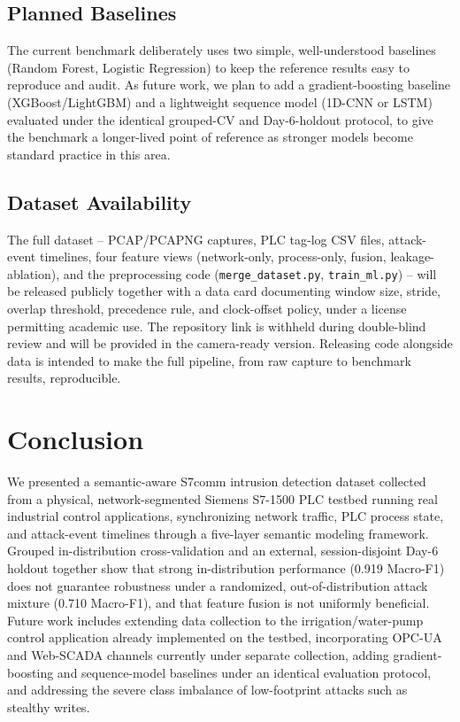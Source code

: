 \documentclass[conference]{IEEEtran}
\begin{document}
\subsection{Planned Baselines}
The current benchmark deliberately uses two simple, well-understood baselines (Random Forest, Logistic Regression) to keep the reference results easy to reproduce and audit. As future work, we plan to add a gradient-boosting baseline (XGBoost/LightGBM) and a lightweight sequence model (1D-CNN or LSTM) evaluated under the identical grouped-CV and Day-6-holdout protocol, to give the benchmark a longer-lived point of reference as stronger models become standard practice in this area.

\subsection{Dataset Availability}
The full dataset -- PCAP/PCAPNG captures, PLC tag-log CSV files, attack-event timelines, four feature views (network-only, process-only, fusion, leakage-ablation), and the preprocessing code (\texttt{merge\_dataset.py}, \texttt{train\_ml.py}) -- will be released publicly together with a data card documenting window size, stride, overlap threshold, precedence rule, and clock-offset policy, under a license permitting academic use. The repository link is withheld during double-blind review and will be provided in the camera-ready version. Releasing code alongside data is intended to make the full pipeline, from raw capture to benchmark results, reproducible.

\section{Conclusion}
We presented a semantic-aware S7comm intrusion detection dataset collected from a physical, network-segmented Siemens S7-1500 PLC testbed running real industrial control applications, synchronizing network traffic, PLC process state, and attack-event timelines through a five-layer semantic modeling framework. Grouped in-distribution cross-validation and an external, session-disjoint Day-6 holdout together show that strong in-distribution performance (0.919 Macro-F1) does not guarantee robustness under a randomized, out-of-distribution attack mixture (0.710 Macro-F1), and that feature fusion is not uniformly beneficial. Future work includes extending data collection to the irrigation/water-pump control application already implemented on the testbed, incorporating OPC-UA and Web-SCADA channels currently under separate collection, adding gradient-boosting and sequence-model baselines under an identical evaluation protocol, and addressing the severe class imbalance of low-footprint attacks such as stealthy writes.
\end{document}
